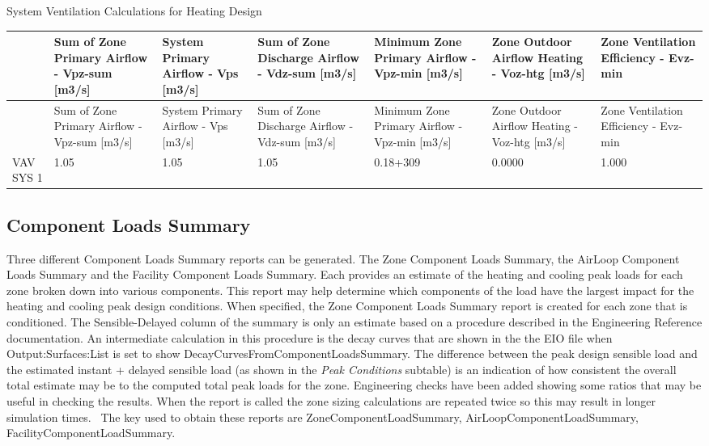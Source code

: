 System Ventilation Calculations for Heating Design

{\scriptsize
\begin{longtable}[c]{>{\raggedright}p{0.85in}>{\raggedright}p{0.85in}>{\raggedright}p{0.85in}>{\raggedright}p{0.85in}>{\raggedright}p{0.85in}>{\raggedright}p{0.85in}>{\raggedright}p{0.85in}}
\toprule
 & Sum of Zone Primary Airflow - Vpz-sum [m3/s] & System Primary Airflow - Vps [m3/s] & Sum of Zone Discharge Airflow - Vdz-sum [m3/s] & Minimum Zone Primary Airflow - Vpz-min [m3/s] & Zone Outdoor Airflow Heating - Voz-htg [m3/s] & Zone Ventilation Efficiency - Evz-min \tabularnewline
\midrule
\endfirsthead

\toprule
 & Sum of Zone Primary Airflow - Vpz-sum [m3/s] & System Primary Airflow - Vps [m3/s] & Sum of Zone Discharge Airflow - Vdz-sum [m3/s] & Minimum Zone Primary Airflow - Vpz-min [m3/s] & Zone Outdoor Airflow Heating - Voz-htg [m3/s] & Zone Ventilation Efficiency - Evz-min \tabularnewline
\midrule
\endhead

VAV SYS 1 & 1.05 & 1.05 & 1.05 & 0.18+309 & 0.0000 & 1.000 \tabularnewline
\bottomrule
\end{longtable}}

\subsection{Component Loads Summary}\label{component-loads-summary}

Three different Component Loads Summary reports can be generated. The Zone Component Loads Summary, the AirLoop Component Loads Summary and the Facility Component Loads Summary. Each provides an estimate of the heating and cooling peak loads for each zone broken down into various components. This report may help determine which components of the load have the largest impact for the heating and cooling peak design conditions. When specified, the Zone Component Loads Summary report is created for each zone that is conditioned. The Sensible-Delayed column of the summary is only an estimate based on a procedure described in the Engineering Reference documentation. An intermediate calculation in this procedure is the decay curves that are shown in the the EIO file when Output:Surfaces:List is set to show DecayCurvesFromComponentLoadsSummary. The difference between the peak design sensible load and the estimated instant + delayed sensible load (as shown in the \emph{Peak Conditions} subtable) is an indication of how consistent the overall total estimate may be to the computed total peak loads for the zone. Engineering checks have been added showing some ratios that may be useful in checking the results. When the report is called the zone sizing calculations are repeated twice so this may result in longer simulation times.~ The key used to obtain these reports are ZoneComponentLoadSummary, AirLoopComponentLoadSummary, FacilityComponentLoadSummary.

